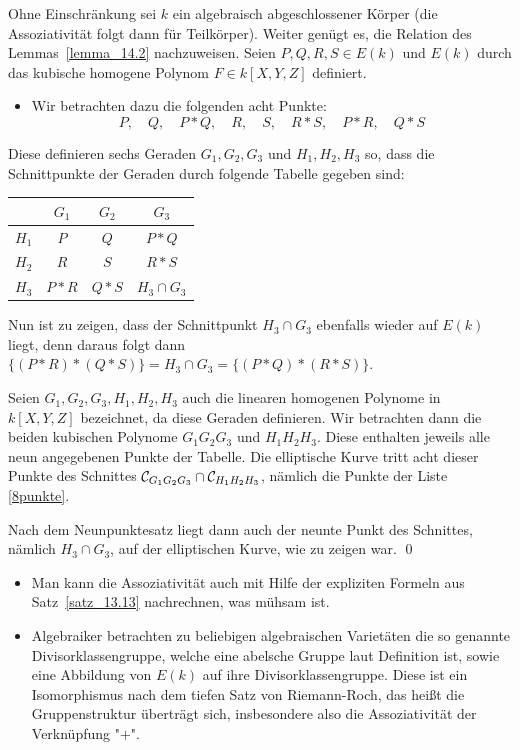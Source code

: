 \begin{bew}
	Ohne Einschränkung sei $k$ ein algebraisch abgeschlossener Körper (die Assoziativität folgt dann für Teilkörper).
	Weiter genügt es, die Relation des Lemmas~\ref{lemma_14.2} nachzuweisen.
	Seien $P,Q,R,S \in E(k)$ und $E(k)$ durch das kubische homogene Polynom $F \in k[X,Y,Z]$ definiert.
	\begin{itemize}
		\item Wir betrachten dazu die folgenden acht Punkte:
		\begin{equation}
			P, \quad Q, \quad P*Q,\quad R,\quad S,\quad R*S,\quad P*R,\quad Q*S \label{8punkte} \tag{\#}
		\end{equation}
	\end{itemize}
	Diese definieren sechs Geraden $G_1,G_2,G_3$ und $H_1,H_2,H_3$ so, dass die Schnittpunkte der Geraden durch folgende Tabelle gegeben sind:
	\begin{center}
		\begin{tabular}{c|ccc}
		& $G_1$ & $G_2$ & $G_3$ \\ 
		\hline $H_1$ & $P$ & $Q$ & $P*Q$ \\ 
		$H_2$ & $R$ & $S$ & $R*S$ \\ 
		$H_3$ & $P*R$ & $Q*S$ & $H_3 \cap G_3$
		\end{tabular}
	\end{center}
	Nun ist zu zeigen, dass der Schnittpunkt $H_3 \cap G_3$ ebenfalls wieder auf $E(k)$ liegt, denn daraus folgt dann $\{(P*R)*(Q*S)\} = H_3 \cap G_3 = \{(P*Q)*(R*S)\}$.
	\item Seien $G_1,G_2,G_3,H_1,H_2,H_3$ auch die linearen homogenen Polynome in $k[X,Y,Z]$ bezeichnet, da diese Geraden definieren.
	Wir betrachten dann die beiden kubischen Polynome $G_1G_2G_3$ und $H_1H_2H_3$.
	Diese enthalten jeweils alle neun angegebenen Punkte der Tabelle.
	Die elliptische Kurve tritt acht dieser Punkte des Schnittes $\mathcal{C}_{G_1G_2G_3} \cap \mathcal{C}_{H_1H_2H_3}$, nämlich die Punkte der Liste \eqref{8punkte}.
	\item Nach dem Neunpunktesatz liegt dann auch der neunte Punkt des Schnittes, nämlich $H_3 \cap G_3$, auf der elliptischen Kurve, wie zu zeigen war. \qed
\end{bew}

\begin{bem}
	\begin{itemize}
		\item Man kann die Assoziativität auch mit Hilfe der expliziten Formeln aus Satz~\ref{satz_13.13} nachrechnen, was mühsam ist.
		\item Algebraiker betrachten zu beliebigen algebraischen Varietäten die so genannte Divisorklassengruppe, welche eine abelsche Gruppe laut Definition ist, sowie eine Abbildung von $E(k)$ auf ihre Divisorklassengruppe.
		Diese ist ein Isomorphismus nach dem tiefen Satz von Riemann-Roch, das heißt die Gruppenstruktur überträgt sich, insbesondere also die Assoziativität der Verknüpfung "$+$".
	\end{itemize}
\end{bem}